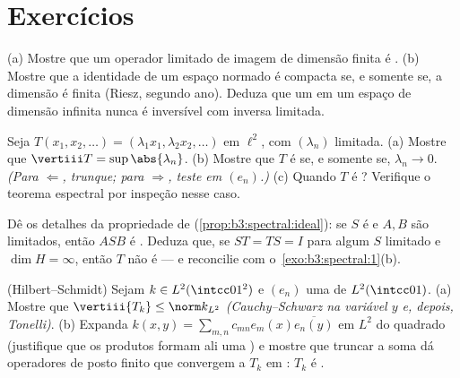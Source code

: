 \section{Exercícios}

\begin{exercise}[$\star$]\label{exo:b3:spectral:1}
(a) Mostre que um operador limitado de imagem de dimensão finita é
.
(b) Mostre que a identidade de um espaço normado é compacta se, e
somente se, a dimensão é finita (Riesz, segundo ano). Deduza que um
 em um espaço de dimensão infinita nunca é inversível
com inversa limitada.
\end{exercise}

\begin{exercise}[$\star$]\label{exo:b3:spectral:2}
Seja $T(x_1, x_2, \dots) = (\lambda_1x_1, \lambda_2x_2, \dots)$ em $\ell^2$, com $(\lambda_n)$ limitada.
(a) Mostre que $\vertiii T = \sup\abs{\lambda_n}$.
(b) Mostre que $T$ é  se, e somente se, $\lambda_n \to 0$. \emph{(Para
$\Leftarrow$, trunque; para $\Rightarrow$, teste em $(e_n)$.)}
(c) Quando $T$ é ? Verifique o teorema espectral por
inspeção nesse caso.
\end{exercise}

\begin{exercise}[$\star\star$]\label{exo:b3:spectral:3}
Dê os detalhes da propriedade de  (\cref{prop:b3:spectral:ideal}): se $S$ é
 e $A, B$ são limitados, então $ASB$ é . Deduza
que, se $ST = TS = I$ para algum $S$ limitado e $\dim H = \infty$, então $T$ não é
 --- e reconcilie com o~\cref{exo:b3:spectral:1}(b).
\end{exercise}

\begin{exercise}[$\star\star$]\label{exo:b3:spectral:4}
(Hilbert--Schmidt) Sejam $k \in L^2(\intcc01^2)$ e $(e_n)$ uma  de
$L^2(\intcc01)$.
(a) Mostre que $\vertiii{T_k} \leq \norm k_{L^2}$ \emph{(Cauchy--Schwarz na variável $y$ e,
depois, Tonelli)}.
(b) Expanda $k(x,y) = \sum_{m,n}c_{mn}e_m(x)\overline{e_n(y)}$ em $L^2$ do quadrado (justifique que os produtos
formam ali uma ) e mostre que truncar a soma dá
operadores de posto finito que convergem a $T_k$ em : $T_k$ é .
\end{exercise}

